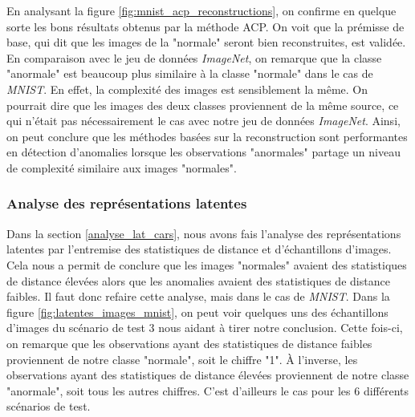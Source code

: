 En analysant la figure \ref{fig:mnist_acp_reconstructions}, on confirme en quelque sorte les bons résultats obtenus par la méthode ACP. On voit que la prémisse de base, qui dit que les images de la "normale" seront bien reconstruites, est validée. En comparaison avec le jeu de données  \textit{ImageNet}, on remarque que la classe "anormale" est beaucoup plus similaire à la classe "normale" dans le cas de \textit{MNIST}. En effet, la complexité des images est sensiblement la même. On pourrait dire que les images des deux classes proviennent de la même source, ce qui n'était pas nécessairement le cas avec notre jeu de données \textit{ImageNet}. Ainsi, on peut conclure que les méthodes basées sur la reconstruction sont performantes en détection d'anomalies lorsque les observations "anormales" partage un niveau de complexité similaire aux images "normales".

\subsubsection{Analyse des représentations latentes} 

Dans la section \ref{analyse_lat_cars}, nous avons fais l'analyse des représentations latentes par l'entremise des statistiques de distance et d'échantillons d'images. Cela nous a permit de conclure que les images "normales" avaient des statistiques de distance élevées alors que les anomalies avaient des statistiques de distance faibles. Il faut donc refaire cette analyse, mais dans le cas de \textit{MNIST}. Dans la figure \ref{fig:latentes_images_mnist}, on peut voir quelques uns des échantillons d'images du scénario de test 3 nous aidant à tirer notre conclusion. Cette fois-ci, on remarque que les observations ayant des statistiques de distance faibles proviennent de notre classe "normale", soit le chiffre "1". À l'inverse, les observations ayant des statistiques de distance élevées proviennent de notre classe "anormale", soit tous les autres chiffres. C'est d'ailleurs le cas pour les 6 différents scénarios de test.

